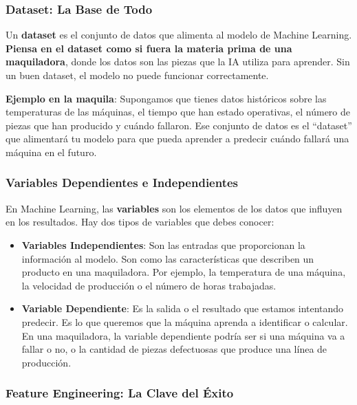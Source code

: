 \subsubsection{\textbf{Dataset: La Base de Todo}}\label{dataset-la-base-de-todo}

Un \textbf{dataset} es el conjunto de datos que alimenta al modelo de Machine Learning. \textbf{Piensa en el dataset como si fuera la materia prima de una maquiladora}, donde los datos son las piezas que la IA utiliza para aprender. Sin un buen dataset, el modelo no puede funcionar correctamente.

\textbf{Ejemplo en la maquila}: Supongamos que tienes datos históricos sobre las temperaturas de las máquinas, el tiempo que han estado operativas, el número de piezas que han producido y cuándo fallaron. Ese conjunto de datos es el ``dataset'' que alimentará tu modelo para que pueda aprender a predecir cuándo fallará una máquina en el futuro.

\subsubsection{\textbf{Variables Dependientes e Independientes}}\label{variables-dependientes-e-independientes}

En Machine Learning, las \textbf{variables} son los elementos de los datos que influyen en los resultados. Hay dos tipos de variables que debes conocer:

\begin{itemize}
    \item \textbf{Variables Independientes}: Son las entradas que proporcionan la información al modelo. Son como las características que describen un producto en una maquiladora. Por ejemplo, la temperatura de una máquina, la velocidad de producción o el número de horas trabajadas.
    \item \textbf{Variable Dependiente}: Es la salida o el resultado que estamos intentando predecir. Es lo que queremos que la máquina aprenda a identificar o calcular. En una maquiladora, la variable dependiente podría ser si una máquina va a fallar o no, o la cantidad de piezas defectuosas que produce una línea de producción.
\end{itemize}

\subsubsection{\textbf{Feature Engineering: La Clave del Éxito}}\label{feature-engineering-la-clave-del-exito}

